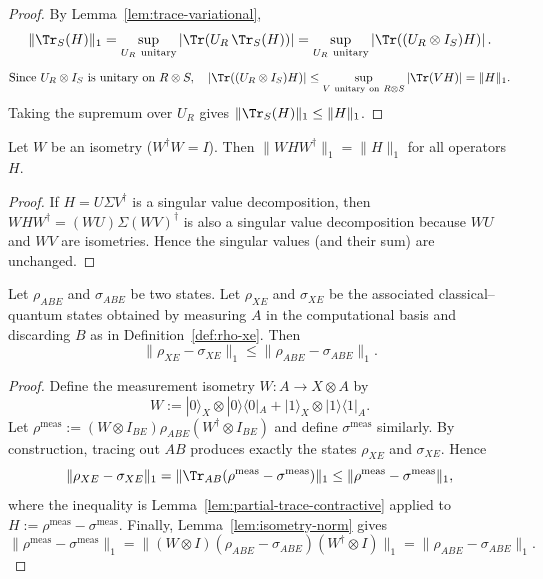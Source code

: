 \begin{proof}
By Lemma~\ref{lem:trace-variational},
\[
\|\Tr_S(H)\|_1
=\sup_{U_R\ \mathrm{unitary}}\left|\Tr\!\left(U_R\,\Tr_S(H)\right)\right|
=\sup_{U_R\ \mathrm{unitary}}\left|\Tr\!\left((U_R\otimes I_S)H\right)\right|.
\]
\[
\text{Since }U_R\otimes I_S\text{ is unitary on }R\otimes S,\quad
\left|\Tr\!\left((U_R\otimes I_S)H\right)\right|
\le
\sup_{V\ \mathrm{unitary\ on}\ R\otimes S}\left|\Tr(VH)\right|
=\|H\|_1.
\]
Taking the supremum over $U_R$ gives $\|\Tr_S(H)\|_1\le \|H\|_1$.
\end{proof}

\begin{lemma}
\label{lem:isometry-norm}
\leanok
Let $W$ be an isometry ($W^\dagger W = I$). Then $\|WHW^\dagger\|_1=\|H\|_1$ for all operators $H$.
\end{lemma}

\begin{proof}
If $H=U\Sigma V^\dagger$ is a singular value decomposition, then $WHW^\dagger=(WU)\Sigma(WV)^\dagger$ is also a singular value decomposition because $WU$ and $WV$ are isometries. Hence the singular values (and their sum) are unchanged.
\end{proof}

\begin{lemma}
\label{lem:measure-contract}
\leanok
Let $\rho_{ABE}$ and $\sigma_{ABE}$ be two states.
Let $\rho_{XE}$ and $\sigma_{XE}$ be the associated classical--quantum states obtained by measuring $A$ in the computational basis and discarding $B$ as in Definition~\ref{def:rho-xe}.
Then
\[
\|\rho_{XE}-\sigma_{XE}\|_1 \le \|\rho_{ABE}-\sigma_{ABE}\|_1.
\]
\end{lemma}

\begin{proof}
Define the measurement isometry $W:A\to X\otimes A$ by
\[
W := |0\rangle_X\otimes |0\rangle\!\langle 0|_A + |1\rangle_X\otimes |1\rangle\!\langle 1|_A.
\]
Let $\rho^{\mathrm{meas}}:=(W\otimes I_{BE})\rho_{ABE}(W^\dagger\otimes I_{BE})$ and define $\sigma^{\mathrm{meas}}$ similarly.
By construction, tracing out $AB$ produces exactly the states $\rho_{XE}$ and $\sigma_{XE}$.
Hence
\[
\|\rho_{XE}-\sigma_{XE}\|_1 = \|\Tr_{AB}(\rho^{\mathrm{meas}}-\sigma^{\mathrm{meas}})\|_1\le \|\rho^{\mathrm{meas}}-\sigma^{\mathrm{meas}}\|_1,
\]
where the inequality is Lemma~\ref{lem:partial-trace-contractive} applied to
$H:=\rho^{\mathrm{meas}}-\sigma^{\mathrm{meas}}$.
Finally, Lemma~\ref{lem:isometry-norm} gives
\[
\|\rho^{\mathrm{meas}}-\sigma^{\mathrm{meas}}\|_1 = \|(W\otimes I)(\rho_{ABE}-\sigma_{ABE})(W^\dagger\otimes I)\|_1 = \|\rho_{ABE}-\sigma_{ABE}\|_1.
\]
\end{proof}
